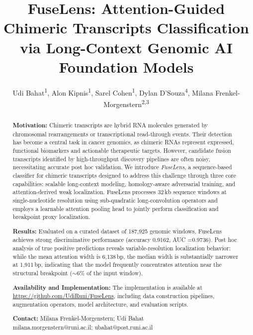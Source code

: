 \documentclass{bioinfo}
\begin{document}

\title[FuseLens]{FuseLens: Attention-Guided Chimeric Transcripts Classification via Long-Context Genomic AI Foundation Models}
\author{
Udi Bahat\textsuperscript{1},
Alon Kipnis\textsuperscript{1},
Sarel Cohen\textsuperscript{1},
Dylan D'Souza\textsuperscript{4},
Milana Frenkel-Morgenstern\textsuperscript{2,3}}
\address{\textsuperscript{1}Efi Arazi School of Computer Science, \textsuperscript{2}Scojen Institute of Synthetic Biology, \textsuperscript{3}Dina Recanati School of Medicine; Reichman University. \textsuperscript{4}The Azrieli Faculty of Medicine, Bar Ilan University.\\  
ubahat@post.runi.ac.il, \{alon.kipnis, sarel.cohen, milana.morgenstern\}@runi.ac.il, dylan.dsouza@biu.ac.il}
\maketitle
\begin{abstract}
\textbf{Motivation:} Chimeric transcripts are hybrid RNA molecules generated by chromosomal rearrangements or transcriptional read-through events. Their detection has become a central task in cancer genomics, as chimeric RNAs represent expressed, functional biomarkers and actionable therapeutic targets. However, candidate fusion transcripts identified by high-throughput discovery pipelines are often noisy, necessitating accurate post hoc validation. We introduce \textit{FuseLens}, a sequence-based classifier for chimeric transcripts designed to address this challenge through three core capabilities: scalable long-context modeling, homology-aware adversarial training, and attention-derived weak localization. FuseLens processes 32\,kb sequence windows at single-nucleotide resolution using sub-quadratic long-convolution operators and employs a learnable attention pooling head to jointly perform classification and breakpoint proxy localization.

\textbf{Results:} Evaluated on a curated dataset of 187{,}925 genomic windows, FuseLens achieves strong discriminative performance (accuracy 0.9162, AUC =0.9736). Post hoc analysis of true positive predictions reveals variable-resolution localization behavior: while the mean attention width is 6{,}138\,bp, the median width is substantially narrower at 1{,}911\,bp, indicating that the model frequently concentrates attention near the structural breakpoint ($\sim$6\% of the input window).

\textbf{Availability and Implementation:} The implementation is available at \href{https://github.com/UdiRuni/FuseLens}{https://github.com/UdiRuni/FuseLens}, including data construction pipelines, augmentation operators, model architecture, and evaluation scripts.

\textbf{Contact:} Milana
Frenkel-Morgenstern; Udi Bahat \\
milana.morgenstern@runi.ac.il; ubahat@post.runi.ac.il
\end{abstract}
\end{document}
